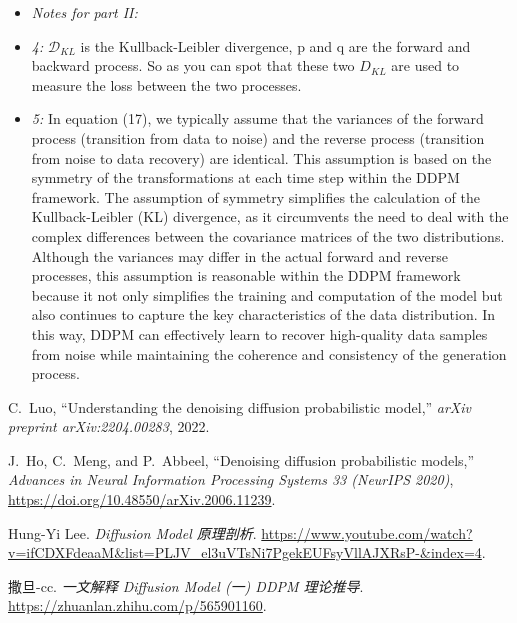 \documentclass{article}
\begin{document}
\begin{itemize}
    \item \textit{Notes for part II:}
    \item \textit{4:} $\mathcal{D}_{KL}$ is the Kullback-Leibler divergence, p and q are the forward and backward process. So as you can spot that these two $D_{KL}$ are used to measure the loss between the two processes.
    \item \textit{5:} In equation (17), we typically assume that the variances of the forward process (transition from data to noise) and the reverse process (transition from noise to data recovery) are identical. 
    This assumption is based on the symmetry of the transformations at each time step within the DDPM framework. The assumption of symmetry simplifies the calculation of the Kullback-Leibler (KL) divergence, 
    as it circumvents the need to deal with the complex differences between the covariance matrices of the two distributions. Although the variances may differ in the actual forward and reverse processes, 
    this assumption is reasonable within the DDPM framework because it not only simplifies the training and computation of the model but also continues to capture the key characteristics of the data distribution. 
    In this way, DDPM can effectively learn to recover high-quality data samples from noise while maintaining the coherence and consistency of the generation process.
\end{itemize}

\renewcommand{\refname}{References}
\begin{thebibliography}{9}
    C.~Luo,
    ``Understanding the denoising diffusion probabilistic model,''
    \textit{arXiv preprint arXiv:2204.00283},
    2022.
    
    J.~Ho, C.~Meng, and P.~Abbeel,
    ``Denoising diffusion probabilistic models,''
    \textit{Advances in Neural Information Processing Systems 33 (NeurIPS 2020)}, 
    \url{https://doi.org/10.48550/arXiv.2006.11239}.

    Hung-Yi Lee.
    \textit{Diffusion Model 原理剖析}.
    \url{https://www.youtube.com/watch?v=ifCDXFdeaaM&list=PLJV_el3uVTsNi7PgekEUFsyVllAJXRsP-&index=4}.

    撒旦-cc.
    \textit{一文解释 Diffusion Model (一) DDPM 理论推导}.
    \url{https://zhuanlan.zhihu.com/p/565901160}.
\end{thebibliography}
\end{document}
